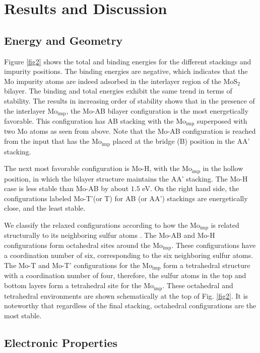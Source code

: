 \documentclass[pra,twocolumn,preprintnumbers,amsmath,amssymb]{revtex4}
\begin{document}
\section{Results and Discussion} \label{Resultados}

\subsection{Energy and Geometry}
Figure \ref{fig2} shows the total and binding energies for the different stackings and impurity positions.  The binding energies are negative, which indicates that the Mo impurity atoms are indeed adsorbed in the interlayer region of the MoS$_{2}$ bilayer.  The binding and total energies exhibit the same trend in terms of stability. The results in increasing order of stability shows that in the presence of the interlayer Mo$_\mathrm{imp}$, the Mo-AB bilayer configuration is the most energetically favorable. This configuration has AB stacking with the Mo$_\mathrm{imp}$ superposed with two Mo atoms as seen from above. Note that the Mo-AB configuration is reached from the input that has the Mo$_\mathrm{imp}$ placed at the bridge (B) position in the AA' stacking.

The next most favorable configuration is Mo-H, with the Mo$_\mathrm{imp}$ in the hollow position, in which the bilayer structure maintains the AA' stacking. The Mo-H case is less stable than Mo-AB by about $1.5$ eV. On the right hand side, the configurations labeled Mo-T'(or T) for AB (or AA') stackings are energetically close, and the least stable.

We classify the relaxed configurations according to how the Mo$_\mathrm{imp}$ is related structurally to its neighboring sulfur atoms  \cite{kertesz1984octahedral,benavente2002intercalation}. The Mo-AB and Mo-H configurations form octahedral sites around the Mo$_\mathrm{imp}$. These configurations have a coordination number of six, corresponding to the six neighboring sulfur atoms. The Mo-T and Mo-T' configurations for the Mo$_\mathrm{imp}$ form a tetrahedral structure with a coordination number of four, therefore, the sulfur atoms in the top and bottom layers form a tetrahedral site for the Mo$_\mathrm{imp}$.
These octahedral and tetrahedral environments are shown schematically at the top of Fig. \ref{fig2}.
It is noteworthy that regardless of the final stacking, octahedral configurations are the most stable.

\subsection{Electronic Properties}
\end{document}
